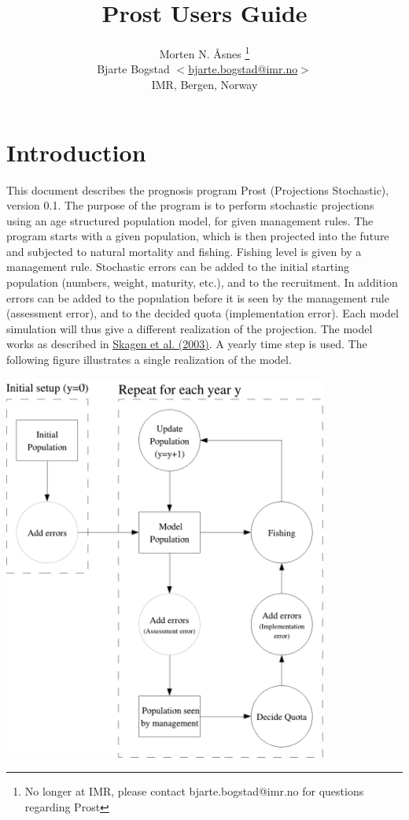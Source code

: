 \documentclass[12pt,twoside,a4paper]{article}
\author{Morten N. Åsnes \footnote{No longer at IMR, please contact bjarte.bogstad@imr.no for questions regarding Prost} \\
			Bjarte Bogstad $<$\href{mailto:bjarte.bogstad@imr.no}{bjarte.bogstad@imr.no}$>$\\
        IMR, Bergen, Norway}
\title{Prost Users Guide}
\begin{document}
\newcommand{\console}[1]{\texttt{\textbf{#1}}}
\newcommand{\file}[1]{\texttt{\textbf{#1}}}
\newcommand{\keyword}[1]{\emph{#1}}
\newcommand{\parameter}[1]{\emph{#1}}
\newenvironment{fileformat}{\ttfamily\begin{center}}{\rmfamily\end{center}}

\maketitle \tableofcontents
\newpage
\section{Introduction}
\label{intro}
This document describes the prognosis program Prost (Projections
Stochastic), version 0.1.  The purpose of the program is to perform
stochastic projections using an age structured population model, for
given management rules. The program starts with a given population,
which is then projected into the future and subjected to natural
mortality and fishing. Fishing level is given by a management
rule. Stochastic errors can be added to the initial starting
population (numbers, weight, maturity, etc.), and to the
recruitment. In addition errors can be added to the population before
it is seen by the management rule (assessment error), and to the
decided quota (implementation error).  Each model simulation will thus
give a different realization of the projection.  The model works as
described in 
\hyperlink{skagen}{Skagen et al. (2003)}.  
A yearly time step is used. The following figure
illustrates a single realization of the model.

\includegraphics[width=0.8\textwidth]{prostflow}
\end{document}
